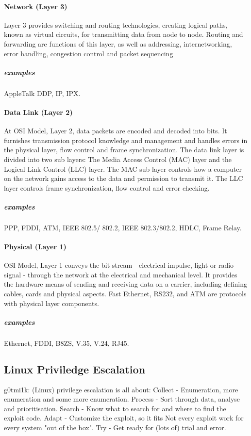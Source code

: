 \documentclass{article}[12pt]
\begin{document}
\paragraph{Network (Layer 3)}

Layer 3 provides switching and routing technologies, creating logical paths, known as virtual circuits, for transmitting data from node to node.
Routing and forwarding are functions of this layer, as well as addressing, internetworking, error handling, congestion control and packet sequencing

\subparagraph{examples} AppleTalk DDP, IP, IPX.



\paragraph{Data Link (Layer 2)}
At OSI Model, Layer 2, data packets are encoded and decoded into bits.
It furnishes transmission protocol knowledge and management and handles errors in the physical layer, flow control and frame synchronization.
The data link layer is divided into two sub layers: The Media Access Control (MAC) layer and the Logical Link Control (LLC) layer.
The MAC sub layer controls how a computer on the network gains access to the data and permission to transmit it.
The LLC layer controls frame synchronization, flow control and error checking.
\subparagraph{examples} PPP, FDDI, ATM, IEEE 802.5/ 802.2, IEEE 802.3/802.2, HDLC, Frame Relay.


\paragraph{Physical (Layer 1)}
OSI Model, Layer 1 conveys the bit stream - electrical impulse, light or radio signal - through the network at the electrical and mechanical level.
It provides the hardware means of sending and receiving data on a carrier, including defining cables, cards and physical aspects.
Fast Ethernet, RS232, and ATM are protocols with physical layer components.
\subparagraph{examples} Ethernet, FDDI, B8ZS, V.35, V.24, RJ45.



\subsection{Linux Priviledge Escalation}

g0tmi1k: (Linux) privilege escalation is all about:
\newline
Collect - Enumeration, more enumeration and some more enumeration. \newline
Process - Sort through data, analyse and prioritisation. \newline
Search - Know what to search for and where to find the exploit code. \newline
Adapt - Customize the exploit, so it fits
Not every exploit work for every system "out of the box". \newline
Try - Get ready for (lots of) trial and error. \newline
\end{document}
